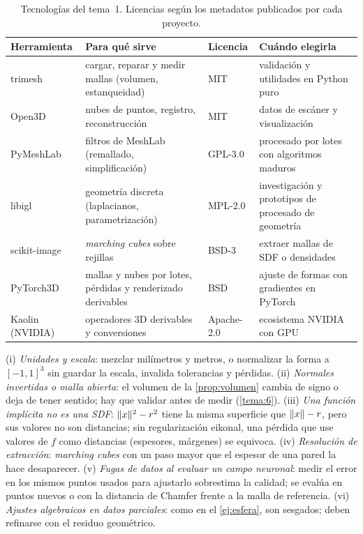 \begin{table}[h]
\centering\small
\begin{tabularx}{\textwidth}{@{}l>{\raggedright\arraybackslash}X>{\raggedright\arraybackslash}p{2.6cm}>{\raggedright\arraybackslash}X@{}}
\toprule
Herramienta & Para qué sirve & Licencia & Cuándo elegirla \\
\midrule
trimesh & cargar, reparar y medir mallas (volumen, estanqueidad) & MIT & validación y utilidades en Python puro \\
Open3D & nubes de puntos, registro, reconstrucción & MIT & datos de escáner y visualización \\
PyMeshLab & filtros de MeshLab (remallado, simplificación) & GPL-3.0 & procesado por lotes con algoritmos maduros \\
libigl & geometría discreta (laplacianos, parametrización) & MPL-2.0 & investigación y prototipos de procesado de geometría \\
scikit-image & \emph{marching cubes} sobre rejillas & BSD-3 & extraer mallas de SDF o densidades \\
PyTorch3D & mallas y nubes por lotes, pérdidas y renderizado derivables & BSD & ajuste de formas con gradientes en PyTorch \\
Kaolin (NVIDIA) & operadores 3D derivables y conversiones & Apache-2.0 & ecosistema NVIDIA con GPU \\
\bottomrule
\end{tabularx}
\caption{Tecnologías del tema~1. Licencias según los metadatos publicados por cada proyecto.}
\label{tab:tec1}
\end{table}

\begin{observacion}\label{obs:errores1}
(i) \emph{Unidades y escala}: mezclar milímetros y metros, o normalizar la forma a $[-1,1]^3$ sin guardar la escala, invalida tolerancias y pérdidas. (ii) \emph{Normales invertidas o malla abierta}: el volumen de la \cref{prop:volumen} cambia de signo o deja de tener sentido; hay que validar antes de medir (\cref{tema:6}). (iii) \emph{Una función implícita no es una SDF}: $\lVert x\rVert^2-r^2$ tiene la misma superficie que $\lVert x\rVert-r$, pero sus valores no son distancias; sin regularización eikonal, una pérdida que use valores de $f$ como distancias (espesores, márgenes) se equivoca. (iv) \emph{Resolución de extracción}: \emph{marching cubes} con un paso mayor que el espesor de una pared la hace desaparecer. (v) \emph{Fugas de datos al evaluar un campo neuronal}: medir el error en los mismos puntos usados para ajustarlo sobrestima la calidad; se evalúa en puntos nuevos o con la distancia de Chamfer frente a la malla de referencia. (vi) \emph{Ajustes algebraicos en datos parciales}: como en el \cref{ej:esfera}, son sesgados; deben refinarse con el residuo geométrico.
\end{observacion}

